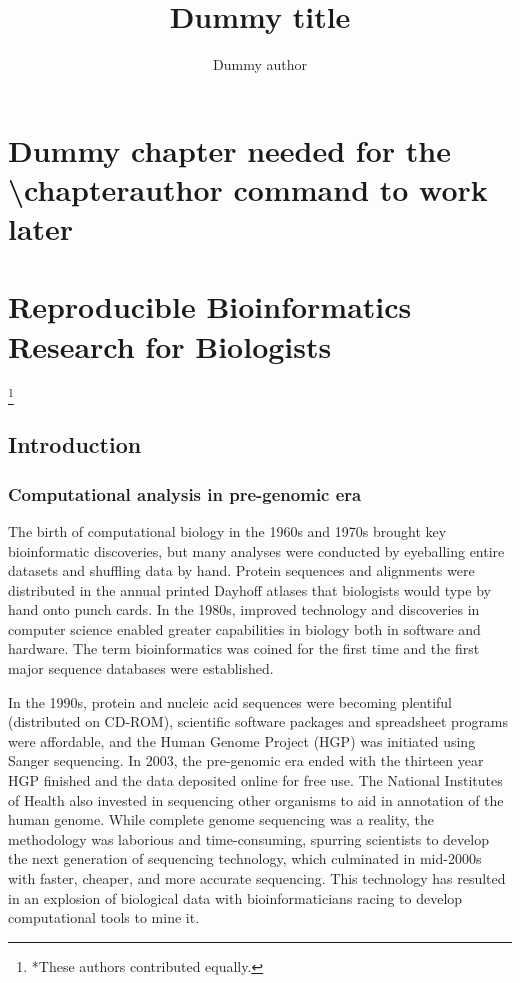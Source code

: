 \documentclass[ChapterTOCs,krantz2]{krantz} %
\begin{document}
\title{Dummy title} \author{Dummy author} \chapter*{Dummy chapter needed for
the \textbackslash chapterauthor command to work later}

\mainmatter



\chapter{Reproducible Bioinformatics Research for Biologists}
\footnote{*These authors contributed equally.}

\section{Introduction}\label{intro}

\subsection{Computational analysis in pre-genomic era}

The birth of computational biology in the 1960s
and 1970s brought key bioinformatic discoveries, but many analyses
were conducted by eyeballing entire datasets and shuffling data by hand.
Protein sequences and alignments were distributed in the annual printed Dayhoff
atlases that biologists would type by hand onto punch cards.  In the 1980s,
improved technology and discoveries in computer science enabled greater
capabilities in biology both in software and hardware.  The term bioinformatics
was coined for the first time and the first major sequence databases were
established. 

In the 1990s, protein and nucleic acid sequences were becoming plentiful
(distributed on CD-ROM), scientific software packages and spreadsheet programs
were affordable, and the Human Genome Project (HGP) was initiated using Sanger
sequencing.  In 2003, the pre-genomic era ended with the thirteen year HGP
finished and the data deposited online for free 
use\cite{Lander2001,Collins2003,HGP}.  The National Institutes of Health also
invested in sequencing other organisms to aid in annotation of the 
human genome.  While complete genome
sequencing was a reality, the methodology was laborious and time-consuming,
spurring scientists to develop the next generation of sequencing technology,
which culminated in mid-2000s with faster, cheaper, and more accurate
sequencing. This technology has resulted in an explosion of biological data
with bioinformaticians racing to develop computational tools to mine it.  
\end{document}

